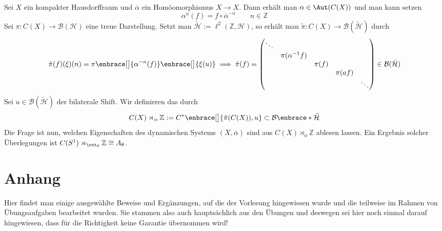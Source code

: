 \begin{beispiel}[{name=[verschränktes Produkt]}]
	Sei $X$ ein kompakter Hausdorffraum und $\overline{\alpha}$ ein Homöomorphismus $X\to X$.
	Dann erhält man $\alpha \in \Aut(C(X))$ und man kann setzen
	\[
		\alpha^n(f) = f \circ \overline{\alpha}^{-n} \qquad n \in \mathbb{Z}
	\]
	Sei $\pi \colon C(X) \to \mathcal{B}(\mathcal{H})$ eine treue Darstellung.
	Setzt man $\tilde{\mathcal{H}} := \ell^2(\mathbb{Z},\mathcal{H})$, so erhält man $\tilde{\pi} \colon C(X) \to \mathcal{B}(\tilde{\mathcal{H}})$ durch
	\[
		\tilde{\pi}(f)(\xi)(n) = \pi \enbrace[\big]{\alpha^{-n}(f)}\enbrace[\big]{\xi(u)} \implies
		\tilde{\pi}(f) = \begin{pmatrix}
			\ddots & & && \\
			& \pi(\alpha^{-1} f) & & &\\
			& & \pi(f) & &\\
			& & & \pi(a f) & \\
			& & & & \ddots
		\end{pmatrix} \in \mathcal{B}(\tilde{\mathcal{H}})
 	\]
	Sei $u \in \mathcal{B}(\tilde{\mathcal{H}})$ der bilaterale Shift.
	Wir definieren das  durch 
	\[
		C(X) \rtimes_\alpha \mathbb{Z} := C^* \enbrace[\big]{\tilde{\pi}(C(X)),u} \subset \mathcal{B}\enbrace*{\tilde{\mathcal{H}}}
	\]
	Die Frage ist nun, welchen Eigenschaften des dynamischen Systems $(X,\overline{\alpha})$ sind aus $C(X) \rtimes_\alpha \mathbb{Z}$ ablesen lassen.
	Ein Ergebnis solcher Überlegungen ist $C(S^1) \rtimes_{\rot_\theta} \mathbb{Z} \cong A_\theta$.
\end{beispiel}











\cleardoubleoddemptypage
{}
\setcounter{page}{1}
\cleardoubleoddemptypage
\appendix

\section{Anhang} %
\label{sec:anhang}
Hier findet man einige ausgewählte Beweise und Ergänzungen, auf die der Vorlesung hingewiesen wurde und die teilweise im Rahmen von Übungsaufgaben bearbeitet wurden.
Sie stammen also auch hauptsächlich aus den Übungen und deswegen sei hier noch einmal darauf hingewiesen, dass für die Richtigkeit keine Garantie übernommen wird!

